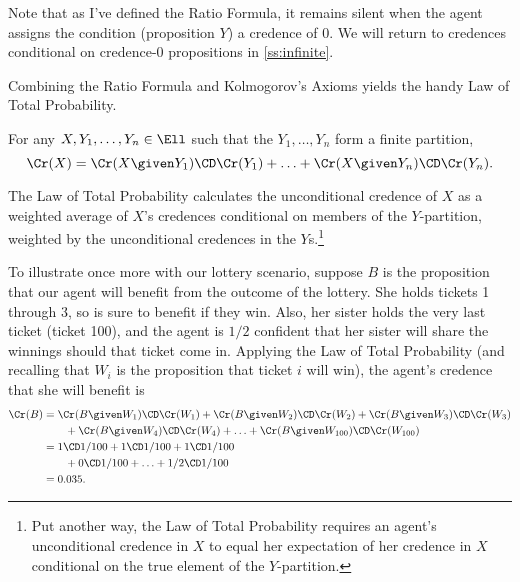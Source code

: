 Note that as I've defined the Ratio Formula, it remains silent when the agent assigns the condition (proposition $Y$) a credence of $0$. We will return to credences conditional on credence-$0$ propositions in \autoref{ss:infinite}.

Combining the Ratio Formula and Kolmogorov's Axioms yields the handy Law of Total Probability.
\begin{description}\label{p:LTP}
\item[Law of Total Probability] {For any $X, Y_1, \ldots, Y_n \in \Ell$ such that the $Y_1, \ldots, Y_n$ form a finite partition, $$\Cr(X)=\Cr(X \given Y_1) \CD \Cr(Y_1) + \ldots + \Cr(X \given Y_n) \CD \Cr(Y_n).$$}
\end{description} 
The Law of Total Probability calculates the unconditional credence of $X$ as a weighted average of $X$'s credences conditional on members of the $Y$-partition, weighted by the unconditional credences in the $Y$s.\footnote
{Put another way, the Law of Total Probability requires an agent's unconditional credence in $X$ to equal her expectation of her credence in $X$ conditional on the true element of the $Y$-partition.}

To illustrate once more with our lottery scenario, suppose $B$ is the proposition that our agent will benefit from the outcome of the lottery. She holds tickets 1 through 3, so is sure to benefit if they win. Also, her sister holds the very last ticket (ticket 100), and the agent is $1/2$ confident that her sister will share the winnings should that ticket come in. Applying the Law of Total Probability (and recalling that $W_i$ is the proposition that ticket $i$ will win), the agent's credence that she will benefit is
\begin{equation}
\begin{aligned}
\Cr(B) &= \Cr(B \given W_1)\CD\Cr(W_1)+\Cr(B \given W_2)\CD\Cr(W_2)+\Cr(B \given W_3)\CD\Cr(W_3)\\
	   &\qquad +\Cr(B \given W_4)\CD\Cr(W_4)+\ldots+\Cr(B \given W_{100})\CD\Cr(W_{100})\\
	   &= 1 \CD 1/100 + 1 \CD 1/100 + 1 \CD 1/100\\
	   &\qquad + 0 \CD 1/100 + \ldots + 1/2 \CD 1/100\\
	   &=0.035.
\end{aligned}
\end{equation}

